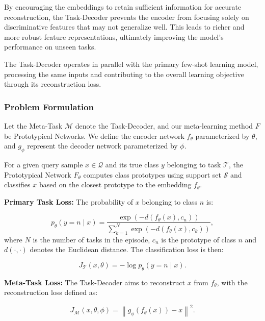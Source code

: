 By encouraging the embeddings to retain sufficient information for accurate reconstruction, the Task-Decoder prevents the encoder from focusing solely on discriminative features that may not generalize well. This leads to richer and more robust feature representations, ultimately improving the model's performance on unseen tasks.

The Task-Decoder operates in parallel with the primary few-shot learning model, processing the same inputs and contributing to the overall learning objective through its reconstruction loss.

\subsubsection{Problem Formulation}

Let the Meta-Task $\mathcal{M}$ denote the Task-Decoder, and our meta-learning method $F$ be Prototypical Networks. We define the encoder network \( f_{\theta} \) parameterized by \( \theta \), and \( g_{\phi} \) represent the decoder network parameterized by \( \phi \). 

For a given query sample \( x\in\mathcal{Q} \) and its true class \( y \) belonging to task $\mathcal{T}$, the Prototypical Network $F_{\theta}$ computes class prototypes using support set $\mathcal{S}$ and classifies $x$ based on the closest prototype to the embedding $f_{\theta}$.

\noindent
\textbf{Primary Task Loss:} The probability of \( x \) belonging to class \( n \) is:

\begin{equation} p_{\theta}(y={n} \mid x) = \frac{\exp\left(-d\left(f_{\theta}(x), c_{{n}}\right)\right)}{\sum_{k=1}^{N} \exp\left(-d\left(f_{\theta}(x), c_k\right)\right)}, \end{equation}
where $N$ is the number of tasks in the episode, \( c_n \) is the prototype of class \( n \) and \( d(\cdot, \cdot) \) denotes the Euclidean distance. The classification loss is then:

\begin{equation}
J_{\mathcal{T}}(x, \theta) = -\log p_{\theta}(y = n \mid x).
\end{equation}

\noindent
\textbf{Meta-Task Loss:} The Task-Decoder aims to reconstruct \( x \) from \( f_{\theta} \), with the reconstruction loss defined as:

\begin{equation}
J_{\mathcal{M}}(x, \theta, \phi) = \left\| g_{\phi}(f_{\theta}(x)) - x \right\|^2.
\end{equation}

